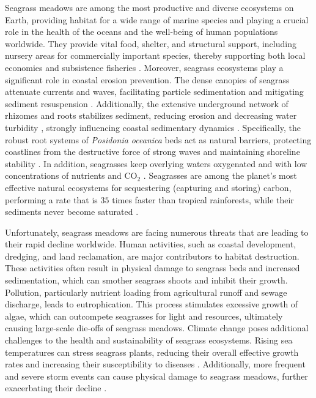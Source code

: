 Seagrass meadows are among the most productive and diverse ecosystems on Earth,
providing habitat for a wide range of marine species \cite{Beck2001} and
playing a crucial role in the health of the oceans and the well-being of human
populations worldwide. They provide vital food, shelter, and structural
support, including nursery areas for commercially important species,
thereby supporting both local economies and subsistence fisheries
\cite{Heck2003}. Moreover, seagrass ecosystems play a significant role in
coastal erosion prevention. The dense canopies of seagrass attenuate currents
and waves, facilitating particle sedimentation and mitigating sediment
resuspension \cite{Granata2001,Koch2006,Bos2007,Gacia2001}. Additionally, the
extensive underground network of rhizomes and roots stabilizes sediment,
reducing erosion and decreasing water turbidity \cite{Madsen2001}, strongly
influencing coastal sedimentary dynamics \cite{Marba2002,vanderHeide2007}.
Specifically, the robust root systems of \textit{Posidonia oceanica} beds act
as natural barriers, protecting coastlines from the destructive force of strong
waves and maintaining shoreline stability
\cite{Fonseca1992,Sanchez-Gonzalez2011,vandeVijsel2023}. In addition,
seagrasses keep overlying
waters oxygenated and with low concentrations of nutrients and CO$_2$
\cite{DuarteChiscano1999}. Seagrasses are among the planet’s most effective
natural ecosystems for sequestering (capturing and storing) carbon, performing
a rate that is $35$ times faster than tropical rainforests, while their
sediments never become saturated \cite{Mcleod2011}.

Unfortunately, seagrass meadows are facing numerous threats that are leading to
their rapid decline worldwide. Human activities, such as coastal development,
dredging, and land reclamation, are major contributors to habitat destruction.
These activities often result in physical damage to seagrass beds and increased
sedimentation, which can smother seagrass shoots and inhibit their growth.
Pollution, particularly nutrient loading from agricultural runoff and sewage
discharge, leads to eutrophication. This process stimulates excessive growth of
algae, which can outcompete seagrasses for light and resources, ultimately
causing large-scale die-offs of seagrass meadows\cite{Orth2006}. Climate change
poses additional challenges to the health and sustainability of seagrass
ecosystems. Rising sea temperatures can stress seagrass plants, reducing their
overall effective growth rates and increasing their susceptibility to diseases
\cite{Waycott2009}. Additionally, more frequent and severe storm events can
cause physical damage to seagrass meadows, further exacerbating their
decline \cite{Bjork2008}.

